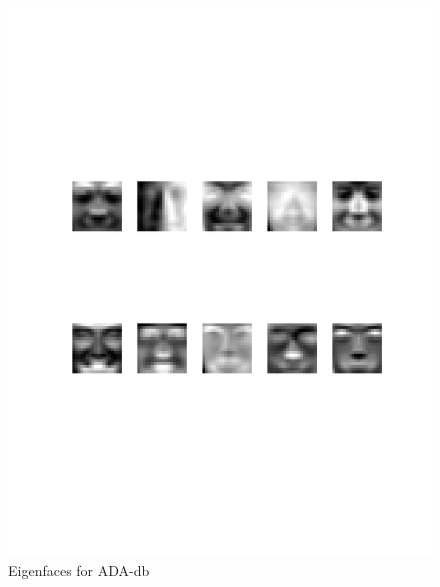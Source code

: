 \documentclass[a4paper,twoside=false,abstract=false,numbers=noenddot,
titlepage=false,headings=small,parskip=half,version=last]{scrartcl}
\theoremstyle{definition}
\theoremstyle{remark}
\begin{document}
\pagebreak
\begin{figure}[t]
    \vspace{-70pt}
    \begin{center}
        \includegraphics[width=1.0\textwidth]{../Result_Pics/ADAFACES_eigen/ADA.pdf}
    \end{center}
    \vspace{-170pt}
    \caption{Eigenfaces for ADA-db}
    \label{fig:ADA}
\end{figure}
\end{document}
